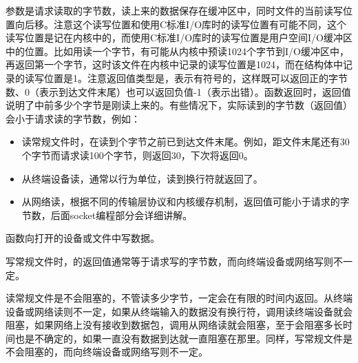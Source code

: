 





参数是请求读取的字节数，读上来的数据保存在缓冲区中，同时文件的当前读写位置向后移。注意这个读写位置和使用C标准I/\BookSplit{}O库时的读写位置有可能不同，这个读写位置是记在内核中的，而使用C标准I/\BookSplit{}O库时的读写位置是用户空间I/\BookSplit{}O缓冲区中的位置。比如用读一个字节，有可能从内核中预读1024个字节到I/\BookSplit{}O缓冲区中，再返回第一个字节，这时该文件在内核中记录的读写位置是1024，而在结构体中记录的读写位置是1。注意返回值类型是，表示有符号的，这样既可以返回正的字节数、0（表示到达文件末尾）也可以返回负值-1（表示出错）。函数返回时，返回值说明了中前多少个字节是刚读上来的。有些情况下，实际读到的字节数（返回值）会小于请求读的字节数，例如：


\begin{itemize}

\item 读常规文件时，在读到个字节之前已到达文件末尾。例如，距文件末尾还有30个字节而请求读100个字节，则返回30，下次将返回0。

\item 从终端设备读，通常以行为单位，读到换行符就返回了。

\item 从网络读，根据不同的传输层协议和内核缓存机制，返回值可能小于请求的字节数，后面socket编程部分会详细讲解。
\end{itemize}


函数向打开的设备或文件中写数据。




写常规文件时，的返回值通常等于请求写的字节数，而向终端设备或网络写则不一定。



读常规文件是不会阻塞的，不管读多少字节，一定会在有限的时间内返回。从终端设备或网络读则不一定，如果从终端输入的数据没有换行符，调用读终端设备就会阻塞，如果网络上没有接收到数据包，调用从网络读就会阻塞，至于会阻塞多长时间也是不确定的，如果一直没有数据到达就一直阻塞在那里。同样，写常规文件是不会阻塞的，而向终端设备或网络写则不一定。



